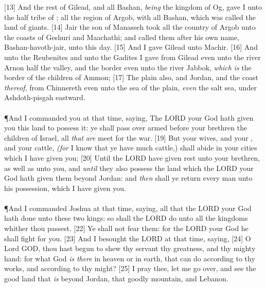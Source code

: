 [13] \textcolor[cmyk]{0.99998,1,0,0}{And the rest of Gilead, and all Bashan, \emph{being} the kingdom of Og, gave I unto the half tribe of ; all the region of Argob, with all Bashan, which was called the land of giants.}
[14] \textcolor[cmyk]{0.99998,1,0,0}{Jair the son of Manasseh took all the country of Argob unto the coasts of Geshuri and Maachathi; and called them after his own name, Bashan-havoth-jair, unto this day.}
[15] \textcolor[cmyk]{0.99998,1,0,0}{And I gave Gilead unto Machir.}
[16] \textcolor[cmyk]{0.99998,1,0,0}{And unto the Reubenites and unto the Gadites I gave from Gilead even unto the river Arnon half the valley, and the border even unto the river Jabbok, \emph{which} \emph{is} the border of the children of Ammon;}
[17] \textcolor[cmyk]{0.99998,1,0,0}{The plain also, and Jordan, and the coast \emph{thereof}, from Chinnereth even unto the sea of the plain, \emph{even} the salt sea, under Ashdoth-pisgah eastward.}\\
\\\P \textcolor[cmyk]{0.99998,1,0,0}{And I commanded you at that time, saying, The LORD your God hath given you this land to possess it: ye shall pass over armed before your brethren the children of Israel, all \emph{that} \emph{are} meet for the war.}
[19] \textcolor[cmyk]{0.99998,1,0,0}{But your wives, and your , and your cattle, \emph{(for} I know that ye have much cattle,) shall abide in your cities which I have given you;}
[20] \textcolor[cmyk]{0.99998,1,0,0}{Until the LORD have given rest unto your brethren, as well as unto you, and \emph{until} they also possess the land which the LORD your God hath given them beyond Jordan: and \emph{then} shall ye return every man unto his possession, which I have given you.}\\
\\
\P \textcolor[cmyk]{0.99998,1,0,0}{And I commanded Joshua at that time, saying,  all that the LORD your God hath done unto these two kings: so shall the LORD do unto all the kingdoms whither thou passest.}
[22] \textcolor[cmyk]{0.99998,1,0,0}{Ye shall not fear them: for the LORD your God he shall fight for you.}
[23] \textcolor[cmyk]{0.99998,1,0,0}{And I besought the LORD at that time, saying,}
[24] \textcolor[cmyk]{0.99998,1,0,0}{O Lord GOD, thou hast begun to shew thy servant thy greatness, and thy mighty hand: for what God \emph{is} \emph{there} in heaven or in earth, that can do according to thy works, and according to thy might?}
[25] \textcolor[cmyk]{0.99998,1,0,0}{I pray thee, let me go over, and see the good land that \emph{is} beyond Jordan, that goodly mountain, and Lebanon.}
